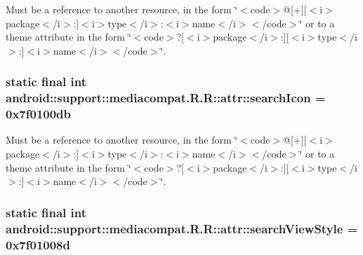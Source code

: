 Must be a reference to another resource, in the form \char`\"{}$<$code$>$@\mbox{[}+\mbox{]}\mbox{[}$<$i$>$package$<$/i$>$:\mbox{]}$<$i$>$type$<$/i$>$:$<$i$>$name$<$/i$>$$<$/code$>$\char`\"{} or to a theme attribute in the form \char`\"{}$<$code$>$?\mbox{[}$<$i$>$package$<$/i$>$:\mbox{]}\mbox{[}$<$i$>$type$<$/i$>$:\mbox{]}$<$i$>$name$<$/i$>$$<$/code$>$\char`\"{}. \hypertarget{classandroid_1_1support_1_1mediacompat_1_1_r_1_1attr_653b01bbd2aa6f004441a21a541a7d84}{
\subsubsection[{searchIcon}]{\setlength{\rightskip}{0pt plus 5cm}static final int android::support::mediacompat.R.R::attr::searchIcon = 0x7f0100db}}
\label{classandroid_1_1support_1_1mediacompat_1_1_r_1_1attr_653b01bbd2aa6f004441a21a541a7d84}


Must be a reference to another resource, in the form \char`\"{}$<$code$>$@\mbox{[}+\mbox{]}\mbox{[}$<$i$>$package$<$/i$>$:\mbox{]}$<$i$>$type$<$/i$>$:$<$i$>$name$<$/i$>$$<$/code$>$\char`\"{} or to a theme attribute in the form \char`\"{}$<$code$>$?\mbox{[}$<$i$>$package$<$/i$>$:\mbox{]}\mbox{[}$<$i$>$type$<$/i$>$:\mbox{]}$<$i$>$name$<$/i$>$$<$/code$>$\char`\"{}. \hypertarget{classandroid_1_1support_1_1mediacompat_1_1_r_1_1attr_b1317c389bdaad934e2b6c6bf120956e}{
\subsubsection[{searchViewStyle}]{\setlength{\rightskip}{0pt plus 5cm}static final int android::support::mediacompat.R.R::attr::searchViewStyle = 0x7f01008d}}
\label{classandroid_1_1support_1_1mediacompat_1_1_r_1_1attr_b1317c389bdaad934e2b6c6bf120956e}


